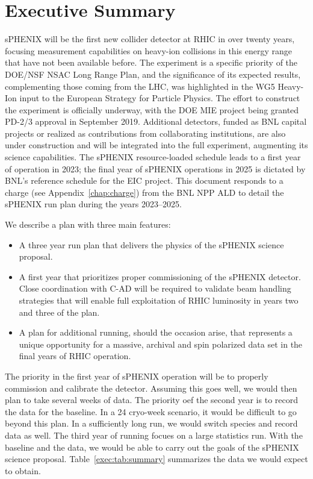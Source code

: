 \chapter*{Executive Summary}
\label{executive_summary}
\setcounter{page}{1}

sPHENIX will be the first new collider detector at RHIC in over twenty years,
focusing measurement capabilities on heavy-ion collisions in this energy range
that have not been available before.  The experiment is a specific priority of
the DOE/NSF NSAC Long Range Plan, and the significance of its expected results,
complementing those coming from the LHC, was highlighted in the WG5 Heavy-Ion
input to the European Strategy for Particle Physics.  The effort to construct
the experiment is officially underway, with the DOE MIE project being granted
PD-2/3 approval in September 2019.  Additional detectors, funded as BNL capital
projects or realized as contributions from collaborating institutions, are also
under construction and will be integrated into the full experiment, augmenting
its science capabilities.  The sPHENIX resource-loaded schedule leads to a first
year of operation in 2023; the final year of sPHENIX operations in 2025 is
dictated by BNL's reference schedule for the EIC project.  This document
responds to a charge (see Appendix~\ref{chap:charge}) from the BNL NPP ALD to
detail the sPHENIX run plan during the years 2023--2025.

We describe a plan with three main features:
\begin{itemize}
\item A three year run plan that delivers the physics of the sPHENIX science proposal.
\item A first year that prioritizes proper commissioning of the
  sPHENIX detector.  Close coordination with C-AD will be required to
  validate beam handling strategies that will enable full exploitation
  of RHIC luminosity in years two and three of the plan.
\item A plan for additional running, should the occasion arise, that
  represents a unique opportunity for a massive, archival \auau and
  spin polarized \pp data set in the final years of RHIC operation.
\end{itemize}

The priority in the first year of sPHENIX operation will be to
properly commission and calibrate the detector.  Assuming this goes
well, we would then plan to take several weeks of \auau data.  The
priority oef the second year is to record the data for the \pp
baseline.  In a 24 cryo-week scenario, it would be difficult to go
beyond this plan.  In a sufficiently long run, we would switch species
and record \pAu data as well.  The third year of running focues on a
large statistics \auau run.  With the \pp baseline and the \auau data,
we would be able to carry out the goals of the sPHENIX science
proposal.  Table~\ref{exec:tab:summary} summarizes the data we would
expect to obtain. 


